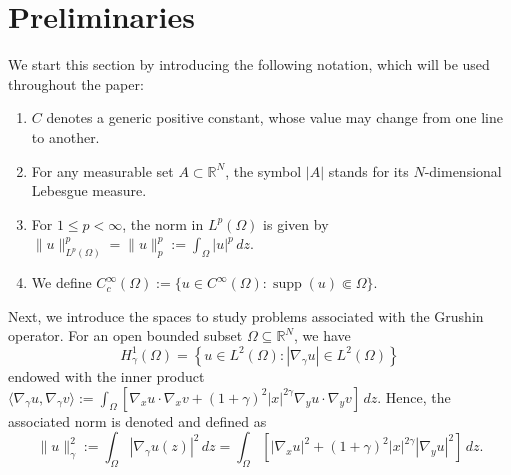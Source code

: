 \documentclass[11pt]{article}
\newcommand{\om} {\Omega}
\newcommand{\rnn}{\mathbb{R}^{N}}
\newcommand{\lv}{\lVert}
\newcommand{\rv}{\rVert}
\newcommand{\grad}{\nabla}
\newcommand{\gradgr}{\nabla_{\gamma}}
\begin{document}
\section{Preliminaries} \label{sec:preliminaries}

We start this section by introducing the following notation, which will be used throughout the paper:
\begin{enumerate}
    \item[$(i)$] $C$ denotes a generic positive constant, whose value may change from one line to another.
    
    \item[$(ii)$] For any measurable set $A \subset \rnn$, the symbol $|A|$ stands for its $N$-dimensional Lebesgue measure.
     
    \item[$(iv)$] For $1 \leq p < \infty$, the norm in $L^p(\om)$ is given by $\lv u \rv_{L^p(\om)}^p = \lv u \rv_{p}^p := \int_{\om} |u|^p\,dz.$
    
    \item[$(v)$] We define $C_c^\infty(\om):=\{u \in C^\infty(\om) : \operatorname{supp}(u)\Subset \om\}$.
   
\end{enumerate}



Next, we introduce the spaces to study problems associated with the Grushin operator. 
For an open bounded subset $\Omega \subseteq \mathbb{R}^N$, we have 
\begin{equation*}
    H_\gamma^1(\Omega) = \left\{ u \in L^2(\Omega) : |\nabla_\gamma u| \in L^2(\Omega) \right\}
\end{equation*}
endowed with the inner product $\langle \gradgr u, \gradgr v\rangle:= \int_{\om} [\grad_x u \cdot \grad_x v + (1+\gamma)^2 |x|^{2\gamma} \grad_y u \cdot \grad_y v ]\,dz$. Hence, the associated norm is denoted and defined as
\begin{equation*}
    \lv  u \rv_{\gamma}^2 := \int_{\om} | \gradgr u (z) |^2 \, dz = \int_{\om} [ |\grad_x u|^2 + (1 + \gamma )^2 |x|^{2 \gamma} |\grad_y u|^2] \, dz.
\end{equation*}
\end{document}
